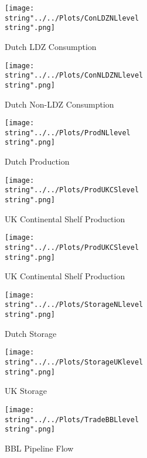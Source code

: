 \begin{figure}[ht]
  \centering
\texttt{[image: \\string"../../Plots/ConLDZNLlevel\\string".png]}
  \caption{Dutch LDZ Consumption}\label{fig:ConLDZNLlevel}
\end{figure}

\begin{figure}[ht]
  \centering
\texttt{[image: \\string"../../Plots/ConNLDZNLlevel\\string".png]}
  \caption{Dutch Non-LDZ Consumption}\label{fig:ConNLDZNLlevel}
\end{figure}

\begin{figure}[ht]
  \centering
\texttt{[image: \\string"../../Plots/ProdNLlevel\\string".png]}
  \caption{Dutch Production}\label{fig:ProdNLlevel}
\end{figure}


\begin{figure}[ht]
  \centering
\texttt{[image: \\string"../../Plots/ProdUKCSlevel\\string".png]}
  \caption{UK Continental Shelf Production}\label{fig:ProdUKCSlevel}
\end{figure}


\begin{figure}[ht]
  \centering
\texttt{[image: \\string"../../Plots/ProdUKCSlevel\\string".png]}
  \caption{UK Continental Shelf Production}\label{fig:ProdUKCSlevel}
\end{figure}

\begin{figure}[ht]
  \centering
\texttt{[image: \\string"../../Plots/StorageNLlevel\\string".png]}
  \caption{Dutch Storage}\label{fig:StorageNLlevel}
\end{figure}


\begin{figure}[ht]
  \centering
\texttt{[image: \\string"../../Plots/StorageUKlevel\\string".png]}
  \caption{UK Storage}\label{fig:StorageUKlevel}
\end{figure}

\begin{figure}[ht]
  \centering
\texttt{[image: \\string"../../Plots/TradeBBLlevel\\string".png]}
  \caption{BBL Pipeline Flow}\label{fig:TradeBBLlevel}
\end{figure}

